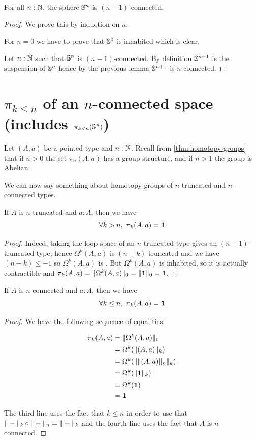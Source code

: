 \begin{cor} \label{cor:sn-connected}
  For all $n:\N$, the sphere $\Sn^n$ is $(n-1)$-connected.
\end{cor}

\begin{proof}
  We prove this by induction on $n$.

  For $n=0$ we have to prove that $\Sn^0$ is inhabited which is clear.

  Let $n:\N$ such that $\Sn^n$ is $(n-1)$-connected. By definition $\Sn^{n+1}$
  is the suspension of $\Sn^n$ hence by the previous lemma $\Sn^{n+1}$ is
  $n$-connected.
\end{proof}

\section{\texorpdfstring{$\pi_{k \le n}$}{π\_(k≤n)} of an \texorpdfstring{$n$}{n}-connected space (includes \texorpdfstring{$\pi_{k < n}(\Sn ^n)$}{π\_(k<n)(Sⁿ)})}
\label{sec:pik-le-n}

Let $(A,a)$ be a pointed type and $n:\N$.  Recall from
\autoref{thm:homotopy-groups} that if $n>0$ the set $\pi_n(A,a)$ has a group
structure, and if $n>1$ the group is Abelian.

We can now say something about homotopy groups of $n$-truncated and
$n$-connected types.

\begin{lem}
  If $A$ is $n$-truncated and $a:A$, then we have
  \[\forall k>n,\ \pi_k(A,a)=\unit\]
\end{lem}

\begin{proof}
  Indeed, taking the loop space of an $n$-truncated type gives an
  $(n-1)$-truncated type, hence $\Omega^k(A,a)$ is $(n-k)$-truncated and we have
  $(n-k)\le-1$ so $\Omega^k(A,a)$ is \anhprop. But $\Omega^k(A,a)$ is inhabited,
  so it is actually contractible and
  $\pi_k(A,a)=\trunc0{\Omega^k(A,a)}=\trunc0{\unit}=\unit$.
\end{proof}

\begin{lem} \label{lem:pik-nconnected}
  If $A$ is $n$-connected and $a:A$, then we have
  \[\forall k\le{}n,\ \pi_k(A,a)=\unit\]
\end{lem}

\begin{proof}
  We have the following sequence of equalities:

  \begin{align*}
    \pi_k(A,a) &= \trunc0{\Omega^k(A,a)} \\
    &= \Omega^k(\trunc k{(A,a)}) \\
    &= \Omega^k(\trunc k{\trunc n{(A,a)}}) \\
    &= \Omega^k(\trunc k{\unit}) \\
    &= \Omega^k(\unit) \\
    &= \unit
  \end{align*}

  The third line uses the fact that $k\le{}n$ in order to use that
  $\truncf k\circ\truncf n=\truncf k$ and the fourth line uses the fact that $A$ is
  $n$-connected.
\end{proof}

